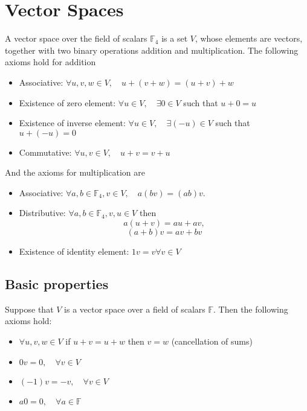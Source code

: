 \documentclass[12pt]{article}
\begin{document}
\section{Vector Spaces}
	\begin{defn}
		A vector space over the field of scalars $\mathbb{F}_4$ is a set $V$, whose elements are 
		vectors, together with two binary operations addition and multiplication. The following axioms hold for addition
		\begin{itemize}
			\item Associative: $\forall u,v,w \in V, \quad u + ( v + w ) = (u + v) + w$
			\item Existence of zero element: $\forall u \in V, \quad \exists 0 \in V$ such that $u + 0 = u$
			\item Existence of inverse element: $\forall u \in V, \quad \exists (-u) \in V$ such that $u + (-u) = 0$
			\item Commutative: $\forall u,v \in V, \quad u + v = v + u$
		\end{itemize}
		And the axioms for multiplication are
		\begin{itemize}
			\item Associative: $\forall a,b \in \mathbb{F}_4, v \in V, \quad a(bv) = (ab)v$.
			\item Distributive: $\forall a,b \in \mathbb{F}_4, v,u \in V$ then
					\[
						a(u+v) = au + av,
					\]
					\[
						(a+b)v = av + bv
					\]
			\item Existence of identity element: $1v = v \forall v \in V$
		\end{itemize}
	\end{defn}
	
	\subsection{Basic properties}
	\begin{thm}
		Suppose that $V$ is a vector space over a field of scalars $\mathbb{F}$. Then the following axioms hold:
		\begin{itemize}
			\item $\forall u,v,w \in V$ if $u + v = u + w$ then $v=w$ (cancellation of sums)
			\item $0v = 0, \quad \forall v \in V$
			\item $(-1)v = -v, \quad \forall v \in V$
			\item $a0 = 0, \quad \forall a \in \mathbb{F}$
		\end{itemize}
	\end{thm}
	
\end{document}
